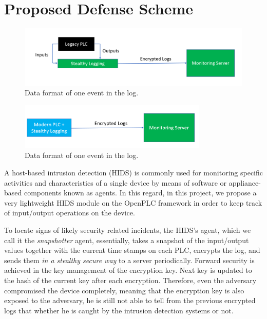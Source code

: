 \section{Proposed Defense Scheme}

\begin{figure}[h]
  \centering
    \includegraphics[width=\textwidth]{figs/legacy_system}
    \caption{Data format of one event in the log.}
    \label{fig:data_format}
\end{figure}

\begin{figure}[h]
  \centering
    \includegraphics[width=0.8\textwidth]{figs/modern_system}
    \caption{Data format of one event in the log.}
    \label{fig:data_format}
\end{figure}


A host-based intrusion detection (HIDS) is commonly used for monitoring specific activities and characteristics of a single device by means of software or appliance-based components known as agents. In this regard, in this project, we propose a very lightweight HIDS module on the OpenPLC framework in order to keep track of input/output operations on the device.

To locate signs of likely security related incidents, the HIDS's agent, which we call it the \emph{snapshotter} agent, essentially, takes a snapshot of the input/output values together with the current time stamps on each PLC, encrypts the log, and sends them \emph{in a stealthy secure way} to a server periodically. Forward security is achieved in the key management of the encryption key. Next key is updated to the hash of the current key after each encryption. Therefore, even the adversary compromised the device completely, meaning that the encryption key is also exposed to the adversary, he is still not able to tell from the previous encrypted logs that whether he is caught by the intrusion detection systems or not.   

